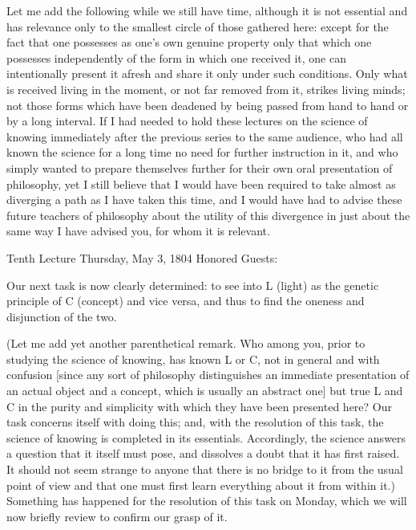 Let me add the following while we still have time,
although it is not essential and has relevance
only to the smallest circle of those gathered here:
except for the fact that one possesses
as one's own genuine property only that which one possesses
independently of the form in which one received it,
one can intentionally present it afresh
and share it only under such conditions.
Only what is received living in the moment,
or not far removed from it, strikes living minds;
not those forms which have been deadened by
being passed from hand to hand or by a long interval.
If I had needed to hold these lectures
on the science of knowing immediately
after the previous series to the same audience,
who had all known the science for a long time
no need for further instruction in it,
and who simply wanted to prepare themselves
further for their own oral presentation of philosophy,
yet I still believe that I would have been required to
take almost as diverging a path as I have taken this time,
and I would have had to advise these future
teachers of philosophy about the utility of this divergence
in just about the same way I have advised you,
for whom it is relevant.

Tenth Lecture
Thursday, May 3, 1804
Honored Guests:

Our next task is now clearly determined:
to see into L (light)
as the genetic principle of C (concept)
and vice versa, and thus to find
the oneness and disjunction of the two.

(Let me add yet another parenthetical remark.
Who among you, prior to studying the science of knowing,
has known L or C, not in general and with confusion
[since any sort of philosophy
distinguishes an immediate presentation
of an actual object and a concept,
which is usually an abstract one]
but true L and C in the purity and simplicity
with which they have been presented here?
Our task concerns itself with doing this;
and, with the resolution of this task,
the science of knowing is completed
in its essentials.
Accordingly, the science answers
a question that it itself must pose,
and dissolves a doubt that it has first raised.
It should not seem strange to anyone that
there is no bridge to it from the usual point of view
and that one must first learn everything
about it from within it.)
Something has happened for the resolution
of this task on Monday,
which we will now briefly review
to confirm our grasp of it.

